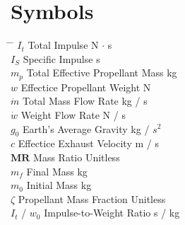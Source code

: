 \documentclass[12pt]{article}
\begin{document}
\section*{Symbols}

\begin{tabbing}
\hspace{2cm} \= \hspace{7cm} \= \kill
    $I_t$                  \> Total Impulse                   \> N $\cdot$ s \\
    $I_S$                  \> Specific Impulse                \> s           \\
    $m_p$                  \> Total Effective Propellant Mass \> kg          \\
    $w$                    \> Effectice Propellant Weight     \> N           \\
    $\dot{m}$              \> Total Mass Flow Rate            \> kg / s      \\
    $\dot{w}$              \> Weight Flow Rate                \> N / s       \\
    $g_0$                  \> Earth's Average Gravity         \> kg / $s^2$  \\
    $c$                    \> Effectice Exhaust Velocity      \> m / s       \\
    $\mathbf{M}\mathbf{R}$ \> Mass Ratio                      \> Unitless    \\
    $m_f$                  \> Final Mass                      \> kg          \\
    $m_0$                  \> Initial Mass                    \> kg          \\
    $\zeta$                \> Propellant Mass Fraction        \> Unitless    \\
    $I_t$ / $w_0$          \> Impulse-to-Weight Ratio         \> s / kg      \\
\end{tabbing}
\end{document}
